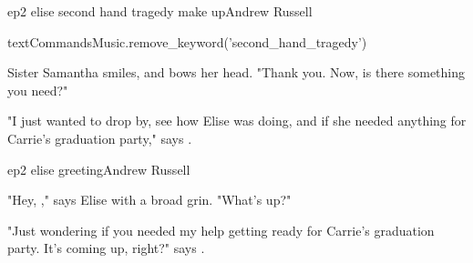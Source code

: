 \documentclass{book}
\begin{document}
\begin{childnode}{ep2 elise second hand tragedy make up}{Andrew Russell}

    \begin{code}

        textCommandsMusic.remove\_keyword('second\_hand\_tragedy')

    \end{code}

    Sister Samantha smiles, and bows her head. "Thank you. Now, is there something you need?"

    "I just wanted to drop by, see how Elise was doing, and if she needed anything for Carrie's graduation party," says \name{}.


\end{childnode}

\begin{childnode}{ep2 elise greeting}{Andrew Russell}

    "Hey, \nickname{}," says Elise with a broad grin. "What's up?"

    "Just wondering if you needed my help getting ready for Carrie's graduation party. It's coming up, right?" says \name{}.


\end{childnode}
\end{document}
